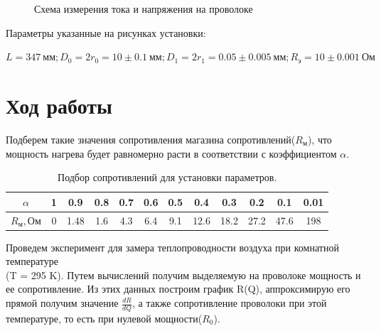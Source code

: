 \documentclass[a4paper, 12pt]{article}%
\begin{document}
\begin{figure}[H]
\begin{center}
\begin{minipage}[h]{0.4\linewidth}
					\caption{Схема измерения тока и напряжения на проволоке}
					
					
				\end{minipage}
				
			\end{center}
		\end{figure}
	Параметры указанные на рисунках установки:\\ 
	\begin{center}
		$L=347~мм; D_{0} = 2r_{0} = 10\pm0.1~мм;D_{1} = 2r_{1} = 0.05\pm 0.005~мм; R_{э}=10\pm0.001~Ом$
	\end{center}
	\section{Ход работы}
	Подберем такие значения сопротивления магазина сопротивлений($R_{м}$), что мощность нагрева будет равномерно расти в соответствии с коэффициентом $\alpha$.
	\begin{table}[H]
		\centering
		\begin{tabular}{|c|c|c|c|c|c|c|c|c|c|c|c|}
			\hline
			$\alpha$ & 1 & 0.9  & 0.8 & 0.7 & 0.6 & 0.5 & 0.4  & 0.3  & 0.2  & 0.1  & 0.01 \\ \hline
			$R_{м}, Ом$     & 0 & 1.48 & 1.6 & 4.3 & 6.4 & 9.1 & 12.6 & 18.2 & 27.2 & 47.6 & 198  \\ \hline
		\end{tabular}
		\caption{Подбор сопротивлений для установки параметров.}
	\end{table}
	Проведем эксперимент для замера теплопроводности воздуха при комнатной температуре\\ (T = 295 K). Путем вычислений получим выделяемую на проволоке мощность и ее сопротивление. Из этих данных построим график R(Q), аппроксимирую его прямой получим значение $\frac{dR}{dQ}$, а также сопротивление проволоки при этой температуре, то есть при нулевой мощности($R_{0}$).
\end{document}
